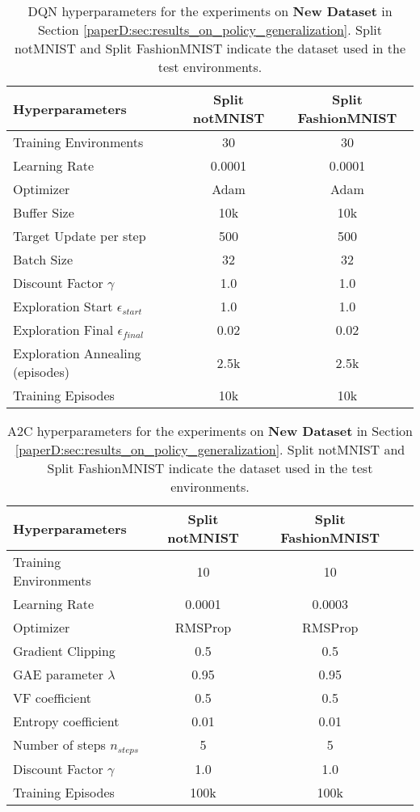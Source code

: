 \begin{table}[h]
\small
\centering
\caption{DQN hyperparameters for the experiments on {\bf New Dataset} in Section \ref{paperD:sec:results_on_policy_generalization}. Split notMNIST and Split FashionMNIST indicate the dataset used in the test environments. 
}
\vspace{-2mm}
\label{tab:dqn_hyperparameters_new_dataset}
\begin{tabular}{l c c}
\toprule
 {\bf Hyperparameters} & {\bf Split notMNIST} & {\bf Split FashionMNIST}  \\
 \midrule
 Training Environments & 30 & 30  \\
 Learning Rate  & 0.0001 & 0.0001  \\
 Optimizer      & Adam & Adam  \\
 Buffer Size    & 10k & 10k   \\
 Target Update per step  & 500 & 500  \\
 Batch Size     & 32 & 32  \\
 Discount Factor $\gamma$ & 1.0 & 1.0  \\
 Exploration Start $\epsilon_{start}$ & 1.0 & 1.0 \\
 Exploration Final $\epsilon_{final}$ & 0.02 & 0.02  \\
 Exploration Annealing (episodes) & 2.5k & 2.5k  \\
 Training Episodes & 10k & 10k  \\
\bottomrule
\end{tabular}
\end{table}

\begin{table}[h]
\small
\centering
\caption{A2C hyperparameters for the experiments on {\bf New Dataset} in Section \ref{paperD:sec:results_on_policy_generalization}. Split notMNIST and Split FashionMNIST indicate the dataset used in the test environments. 
}
\vspace{-2mm}
\label{tab:a2c_hyperparameters_new_dataset}
\begin{tabular}{l c c c}
\toprule
 {\bf Hyperparameters} & {\bf Split notMNIST} & {\bf Split FashionMNIST}  \\
 \midrule
 Training Environments & 10 & 10  \\
 Learning Rate  & 0.0001 & 0.0003  \\
 Optimizer      & RMSProp & RMSProp  \\
 Gradient Clipping & 0.5 & 0.5  \\
 GAE parameter $\lambda$ & 0.95 & 0.95  \\
 VF coefficient & 0.5 & 0.5 \\
 Entropy coefficient & 0.01 & 0.01  \\
 Number of steps $n_{steps}$ & 5 & 5  \\
 Discount Factor $\gamma$ & 1.0 & 1.0  \\
 Training Episodes & 100k & 100k  \\
\bottomrule
\end{tabular}
\end{table}


